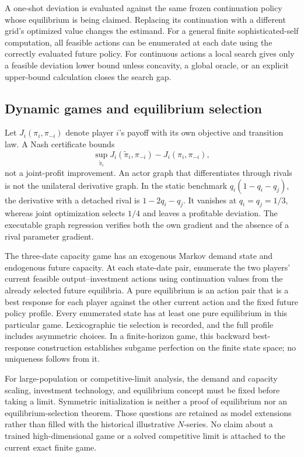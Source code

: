 A one-shot deviation is evaluated against the same frozen continuation policy whose equilibrium is being claimed. Replacing its continuation with a different grid's optimized value changes the estimand. For a general finite sophisticated-self computation, all feasible actions can be enumerated at each date using the correctly evaluated future policy. For continuous actions a local search gives only a feasible deviation lower bound unless concavity, a global oracle, or an explicit upper-bound calculation closes the search gap.

\subsection{Dynamic games and equilibrium selection}
Let $J_i(\pi_i,\pi_{-i})$ denote player $i$'s payoff with its own objective and transition law. A Nash certificate bounds
\[
\sup_{\widetilde\pi_i}J_i(\widetilde\pi_i,\pi_{-i})-J_i(\pi_i,\pi_{-i}),
\]
not a joint-profit improvement. An actor graph that differentiates through rivals is not the unilateral derivative graph. In the static benchmark $q_i(1-q_i-q_j)$, the derivative with a detached rival is $1-2q_i-q_j$. It vanishes at $q_i=q_j=1/3$, whereas joint optimization selects $1/4$ and leaves a profitable deviation. The executable graph regression verifies both the own gradient and the absence of a rival parameter gradient.

The three-date capacity game has an exogenous Markov demand state and endogenous future capacity. At each state-date pair, enumerate the two players' current feasible output--investment actions using continuation values from the already selected future equilibria. A pure equilibrium is an action pair that is a best response for each player against the other current action and the fixed future policy profile. Every enumerated state has at least one pure equilibrium in this particular game. Lexicographic tie selection is recorded, and the full profile includes asymmetric choices. In a finite-horizon game, this backward best-response construction establishes subgame perfection on the finite state space; no uniqueness follows from it.

For large-population or competitive-limit analysis, the demand and capacity scaling, investment technology, and equilibrium concept must be fixed before taking a limit. Symmetric initialization is neither a proof of equilibrium nor an equilibrium-selection theorem. Those questions are retained as model extensions rather than filled with the historical illustrative $N$-series. No claim about a trained high-dimensional game or a solved competitive limit is attached to the current exact finite game.

